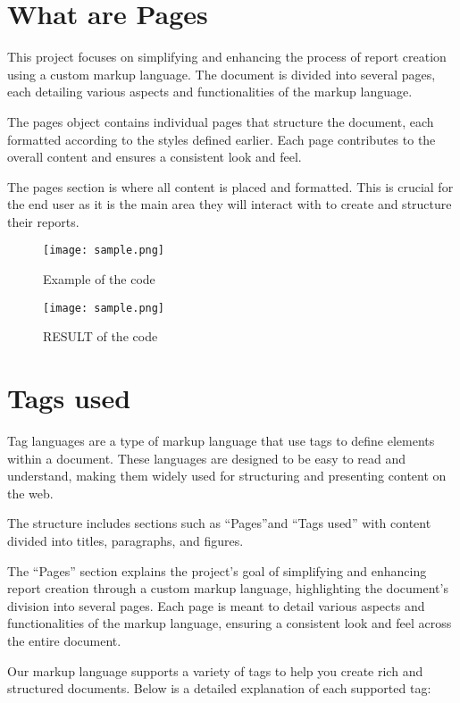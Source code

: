 \documentclass[oneside]{book}
\begin{document}
\section{What are Pages}
This project focuses on simplifying and enhancing the process of report creation using a custom markup language. The document is divided into several 
            pages, each detailing various aspects and functionalities of the markup language. \par
The pages object contains individual pages that structure the document, each formatted according to the styles defined earlier. Each page contributes 
            to the overall content and ensures a consistent look and feel.\par
The pages section is where all content is placed and formatted. This is crucial for the end user as it is the main area they will interact with to create 
            and structure their reports.\par
\begin{figure}[h]
\centering
\texttt{[image: sample.png]}
\caption{Example of the code}
\end{figure}\begin{figure}[h]
\centering
\texttt{[image: sample.png]}
\caption{RESULT of the code}
\end{figure}\section{Tags used}
Tag languages are a type of markup language that use tags to define elements within a document. These languages are designed to be easy to read and 
            understand, making them widely used for structuring and presenting content on the web.\par
The structure includes sections such as ``Pages''and ``Tags used'' with content divided into titles, paragraphs, and figures.\par
The ``Pages'' section explains the project's goal of simplifying and enhancing report creation through a custom markup language, highlighting the document's
            division into several pages. Each page is meant to detail various aspects and functionalities of the markup language, ensuring a consistent look and feel
            across the entire document.\par
Our markup language supports a variety of tags to help you create rich and structured documents. Below is a detailed explanation of each supported tag:\par
\end{document}
